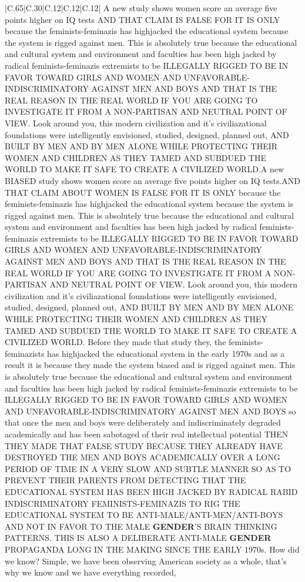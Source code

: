 \documentclass[11pt]{article}
\newlength\mylength
\begin{document}
\begin{center}
\begin{longtable}{|C{.65\mylength}|C{.30\mylength}|C{.12\mylength}|C{.12\mylength}|C{.12\mylength}|}
  \small A new study shows women score an average five points higher on IQ tests AND THAT CLAIM IS FALSE FOR IT IS ONLY because the feminists-feminazis has highjacked the educational system because the system is rigged against men. This is absolutely true because the educational and cultural system and environment and faculties has been high jacked by radical feminists-feminazis extremists to be ILLEGALLY RIGGED TO BE IN FAVOR TOWARD GIRLS AND WOMEN AND UNFAVORABLE-INDISCRIMINATORY AGAINST MEN AND BOYS AND THAT IS THE REAL REASON IN THE REAL WORLD IF YOU ARE GOING TO INVESTIGATE IT FROM A NON-PARTISAN AND NEUTRAL POINT OF VIEW. Look around you, this modern civilization and it's civiliazational foundations were intelligently envisioned, studied, designed, planned out, AND BUILT BY MEN AND BY MEN ALONE WHILE PROTECTING THEIR WOMEN AND CHILDREN AS THEY TAMED AND SUBDUED THE WORLD TO MAKE IT SAFE TO CREATE A CIVILIZED WORLD.A new BIASED study shows women score an average five points higher on IQ tests.AND THAT CLAIM ABOUT WOMEN IS FALSE FOR IT IS ONLY because the feminists-feminazis has highjacked the educational system because the system is rigged against men. This is absolutely true because the educational and cultural system and environment and faculties has been high jacked by radical feminists-feminazis extremists to be ILLEGALLY RIGGED TO BE IN FAVOR TOWARD GIRLS AND WOMEN AND UNFAVORABLE-INDISCRIMINATORY AGAINST MEN AND BOYS AND THAT IS THE REAL REASON IN THE REAL WORLD IF YOU ARE GOING TO INVESTIGATE IT FROM A NON-PARTISAN AND NEUTRAL POINT OF VIEW. Look around you, this modern civilization and it's civiliazational foundations were intelligently envisioned, studied, designed, planned out, AND BUILT BY MEN AND BY MEN ALONE WHILE PROTECTING THEIR WOMEN AND CHILDREN AS THEY TAMED AND SUBDUED THE WORLD TO MAKE IT SAFE TO CREATE A CIVILIZED WORLD. Before they made that study they, the feminists-feminazists has highjacked the educational system in the early 1970s and as a result it is because they made the system biased and is rigged against men. This is absolutely true because the educational and cultural system and environment and faculties has been high jacked by radical feminists-feminazis extremists to be ILLEGALLY RIGGED TO BE IN FAVOR TOWARD GIRLS AND WOMEN AND UNFAVORABLE-INDISCRIMINATORY AGAINST MEN AND BOYS so that once the men and boys were deliberately and indiscriminately degraded academically and has been sabotaged of their real intellectual potential THEN THEY MADE THAT FALSE STUDY BECAUSE THEY ALREADY HAVE DESTROYED THE MEN AND BOYS ACADEMICALLY OVER A LONG PERIOD OF TIME IN A VERY SLOW AND SUBTLE MANNER SO AS TO PREVENT THEIR PARENTS FROM DETECTING THAT THE EDUCATIONAL SYSTEM HAS BEEN HIGH JACKED BY RADICAL RABID INDISCRIMINATORY FEMINISTS-FEMINAZIS TO RIG THE EDUCATIONAL SYSTEM TO BE ANTI-MALE/ANTI-MEN/ANTI-BOYS AND NOT IN FAVOR TO THE MALE \textbf{GENDER}'S BRAIN THINKING PATTERNS. THIS IS ALSO A DELIBERATE ANTI-MALE \textbf{GENDER} PROPAGANDA LONG IN THE MAKING SINCE THE EARLY 1970s. How did we know? Simple, we have been observing American society as a whole, that's why we know and we have everything recorded, 
\end{longtable}
\end{center}
\end{document}
